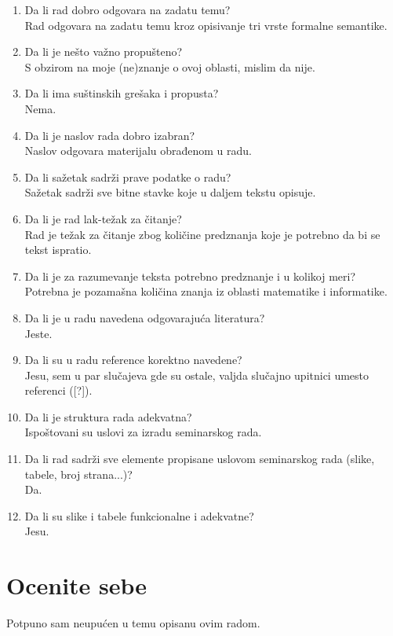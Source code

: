 \documentclass[a4paper]{report}
\begin{document}
\begin{enumerate}
\item Da li rad dobro odgovara na zadatu temu?\\
Rad odgovara na zadatu temu kroz opisivanje tri vrste formalne semantike.
\item Da li je nešto važno propušteno?\\
S obzirom na moje (ne)znanje o ovoj oblasti, mislim da nije.
\item Da li ima suštinskih grešaka i propusta?\\
Nema.
\item Da li je naslov rada dobro izabran?\\
Naslov odgovara materijalu obrađenom u radu.
\item Da li sažetak sadrži prave podatke o radu?\\
Sažetak sadrži sve bitne stavke koje u daljem tekstu opisuje.
\item Da li je rad lak-težak za čitanje?\\
Rad je težak za čitanje zbog količine predznanja koje je potrebno da bi se tekst ispratio.
\item Da li je za razumevanje teksta potrebno predznanje i u kolikoj meri?\\
Potrebna je pozamašna količina znanja iz oblasti matematike i informatike.
\item Da li je u radu navedena odgovarajuća literatura?\\
Jeste.
\item Da li su u radu reference korektno navedene?\\
Jesu, sem u par slučajeva gde su ostale, valjda slučajno upitnici umesto referenci ([?]).
\item Da li je struktura rada adekvatna?\\
Ispoštovani su uslovi za izradu seminarskog rada.
\item Da li rad sadrži sve elemente propisane uslovom seminarskog rada (slike, tabele, broj strana...)?\\
Da.
\item Da li su slike i tabele funkcionalne i adekvatne?\\
Jesu.
\end{enumerate}

\section{Ocenite sebe}
Potpuno sam neupućen u temu opisanu ovim radom.
\end{document}
